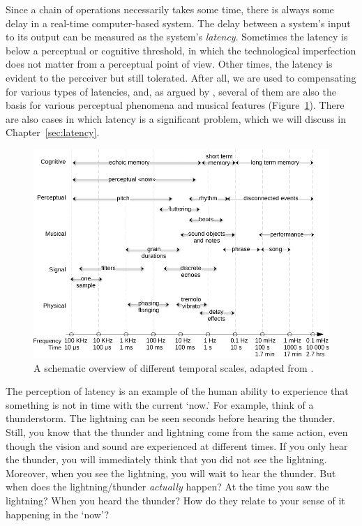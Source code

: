 Since a chain of operations necessarily takes some time, there is always some delay in a real-time computer-based system. The delay between a system's input to its output can be measured as the system's \emph{latency}. Sometimes the latency is below a perceptual or cognitive threshold, in which the technological imperfection does not matter from a perceptual point of view. Other times, the latency is evident to the perceiver but still tolerated. After all, we are used to compensating for various types of latencies, and, as argued by \citet{sethares_rhythm_2007}, several of them are also the basis for various perceptual phenomena and musical features (Figure~\ref{fig:time-sethares}). There are also cases in which latency is a significant problem, which we will discuss in Chapter~\ref{sec:latency}.

\begin{figure}[tp]
\includegraphics[width=\columnwidth]{figures/08-time-durations-crop.pdf}
\caption{A schematic overview of different temporal scales, adapted from \citep[p.7]{sethares_rhythm_2007}.}
\label{fig:time-sethares}
\end{figure}

The perception of latency is an example of the human ability to experience that something is not in time with the current `now.' For example, think of a thunderstorm. The lightning can be seen seconds before hearing the thunder. Still, you know that the thunder and lightning come from the same action, even though the vision and sound are experienced at different times. If you only hear the thunder, you will immediately think that you did not see the lightning. Moreover, when you see the lightning, you will wait to hear the thunder. But when does the lightning/thunder \emph{actually} happen? At the time you saw the lightning? When you heard the thunder? How do they relate to your sense of it happening in the `now'?

